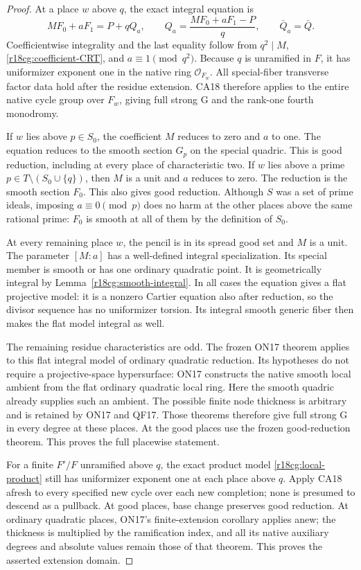 \begin{proof}
At a place $w$ above $q$, the exact integral equation is
\[
 MF_0+aF_1=P+qQ_a,\qquad
 Q_a=\frac{MF_0+aF_1-P}{q},\qquad \bar Q_a=\bar Q.
 \tag{CG18.10}\label{r18cg:local-product}
\]
Coefficientwise integrality and the last equality follow
from $q^2\mid M$, \eqref{r18cg:coefficient-CRT}, and
$a\equiv1\pmod{q^2}$.  Because $q$ is unramified in $F$,
it has uniformizer exponent one in the native ring
$\mathcal O_{F_w}$.  All special-fiber transverse factor
data hold after the residue extension.  CA18 therefore
applies to the entire native cycle group over $F_w$,
giving full strong G and the rank-one fourth monodromy.

If $w$ lies above $p\in S_0$, the coefficient $M$ reduces
to zero and $a$ to one.  The equation reduces to the
smooth section $G_p$ on the special quadric.  This is
good reduction, including at every place of characteristic
two.  If $w$ lies above a prime
$p\in T\setminus(S_0\cup\{q\})$, then $M$ is a unit
and $a$ reduces to zero.  The reduction is the smooth
section $F_0$.  This also gives good reduction.  Although
$S$ was a set of prime ideals, imposing $a\equiv0\pmod p$
does no harm at the other places above the same rational
prime: $F_0$ is smooth at all of them by the definition
of $S_0$.

At every remaining place $w$, the pencil is in its
spread good set and $M$ is a unit.  The parameter
$[M:a]$ has a well-defined integral specialization.
Its special member is smooth or has one ordinary
quadratic point.  It is geometrically integral by
Lemma~\ref{r18cg:smooth-integral}.  In all cases the
equation gives a flat projective model: it is a
nonzero Cartier equation also after reduction, so
the divisor sequence has no uniformizer torsion.
Its integral smooth generic fiber then makes the
flat model integral as well.

The remaining residue characteristics are odd.
The frozen ON17 theorem applies to this flat integral
model of ordinary quadratic reduction.  Its hypotheses
do not require a projective-space hypersurface: ON17
constructs the native smooth local ambient from the
flat ordinary quadratic local ring.  Here the smooth
quadric already supplies such an ambient.
The possible finite node thickness is arbitrary and
is retained by ON17 and QF17.  Those theorems therefore
give full strong G in every degree at these places.
At the good places use the frozen good-reduction theorem.
This proves the full placewise statement.

For a finite $F'/F$ unramified above $q$, the exact
product model \eqref{r18cg:local-product} still has
uniformizer exponent one at each place above $q$.
Apply CA18 afresh to every specified new cycle over
each new completion; none is presumed to descend as
a pullback.  At good places, base change preserves
good reduction.  At ordinary quadratic places,
ON17's finite-extension corollary applies anew;
the thickness is multiplied by the ramification
index, and all its native auxiliary degrees and
absolute values remain those of that theorem.
This proves the asserted extension domain.


\end{proof}
